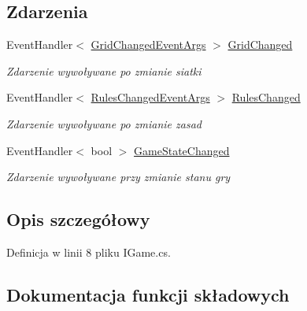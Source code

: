 \subsection*{Zdarzenia}
\begin{DoxyCompactItemize}
\item 
Event\+Handler$<$ \hyperlink{class_convay_1_1_core_1_1_grid_changed_event_args}{Grid\+Changed\+Event\+Args} $>$ \hyperlink{interface_convay_1_1_core_1_1_interfaces_1_1_i_game_abfec674f941f9534cffa15f6bd5c96b1}{Grid\+Changed}
\begin{DoxyCompactList}\small\item\em Zdarzenie wywoływane po zmianie siatki \end{DoxyCompactList}\item 
Event\+Handler$<$ \hyperlink{class_convay_1_1_core_1_1_rules_changed_event_args}{Rules\+Changed\+Event\+Args} $>$ \hyperlink{interface_convay_1_1_core_1_1_interfaces_1_1_i_game_ad5852d1b52121c09411298ab1da6615e}{Rules\+Changed}
\begin{DoxyCompactList}\small\item\em Zdarzenie wywoływane po zmianie zasad \end{DoxyCompactList}\item 
Event\+Handler$<$ bool $>$ \hyperlink{interface_convay_1_1_core_1_1_interfaces_1_1_i_game_a7c8532b2d8ae9edd0e39a21cab0a8b9f}{Game\+State\+Changed}
\begin{DoxyCompactList}\small\item\em Zdarzenie wywoływane przy zmianie stanu gry \end{DoxyCompactList}\end{DoxyCompactItemize}


\subsection{Opis szczegółowy}


Definicja w linii 8 pliku I\+Game.\+cs.



\subsection{Dokumentacja funkcji składowych}
\hypertarget{interface_convay_1_1_core_1_1_interfaces_1_1_i_game_a782f64a6dd964db6c27752dd9962c1c1}{}\label{interface_convay_1_1_core_1_1_interfaces_1_1_i_game_a782f64a6dd964db6c27752dd9962c1c1} 

